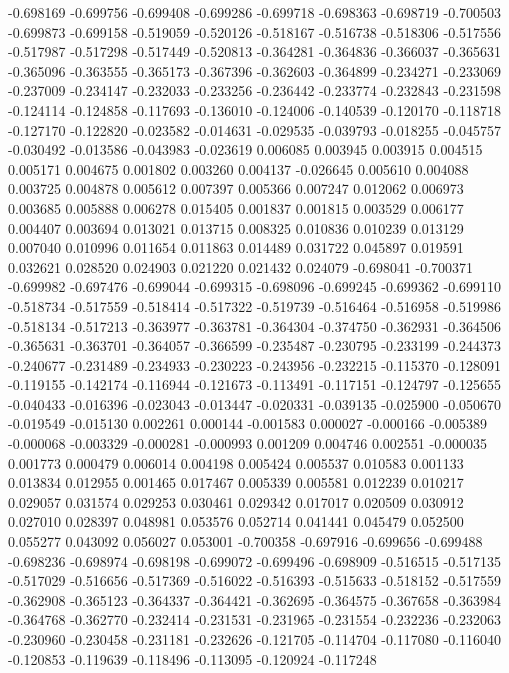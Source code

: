 -0.698169
-0.699756
-0.699408
-0.699286
-0.699718
-0.698363
-0.698719
-0.700503
-0.699873
-0.699158
-0.519059
-0.520126
-0.518167
-0.516738
-0.518306
-0.517556
-0.517987
-0.517298
-0.517449
-0.520813
-0.364281
-0.364836
-0.366037
-0.365631
-0.365096
-0.363555
-0.365173
-0.367396
-0.362603
-0.364899
-0.234271
-0.233069
-0.237009
-0.234147
-0.232033
-0.233256
-0.236442
-0.233774
-0.232843
-0.231598
-0.124114
-0.124858
-0.117693
-0.136010
-0.124006
-0.140539
-0.120170
-0.118718
-0.127170
-0.122820
-0.023582
-0.014631
-0.029535
-0.039793
-0.018255
-0.045757
-0.030492
-0.013586
-0.043983
-0.023619
0.006085
0.003945
0.003915
0.004515
0.005171
0.004675
0.001802
0.003260
0.004137
-0.026645
0.005610
0.004088
0.003725
0.004878
0.005612
0.007397
0.005366
0.007247
0.012062
0.006973
0.003685
0.005888
0.006278
0.015405
0.001837
0.001815
0.003529
0.006177
0.004407
0.003694
0.013021
0.013715
0.008325
0.010836
0.010239
0.013129
0.007040
0.010996
0.011654
0.011863
0.014489
0.031722
0.045897
0.019591
0.032621
0.028520
0.024903
0.021220
0.021432
0.024079
-0.698041
-0.700371
-0.699982
-0.697476
-0.699044
-0.699315
-0.698096
-0.699245
-0.699362
-0.699110
-0.518734
-0.517559
-0.518414
-0.517322
-0.519739
-0.516464
-0.516958
-0.519986
-0.518134
-0.517213
-0.363977
-0.363781
-0.364304
-0.374750
-0.362931
-0.364506
-0.365631
-0.363701
-0.364057
-0.366599
-0.235487
-0.230795
-0.233199
-0.244373
-0.240677
-0.231489
-0.234933
-0.230223
-0.243956
-0.232215
-0.115370
-0.128091
-0.119155
-0.142174
-0.116944
-0.121673
-0.113491
-0.117151
-0.124797
-0.125655
-0.040433
-0.016396
-0.023043
-0.013447
-0.020331
-0.039135
-0.025900
-0.050670
-0.019549
-0.015130
0.002261
0.000144
-0.001583
0.000027
-0.000166
-0.005389
-0.000068
-0.003329
-0.000281
-0.000993
0.001209
0.004746
0.002551
-0.000035
0.001773
0.000479
0.006014
0.004198
0.005424
0.005537
0.010583
0.001133
0.013834
0.012955
0.001465
0.017467
0.005339
0.005581
0.012239
0.010217
0.029057
0.031574
0.029253
0.030461
0.029342
0.017017
0.020509
0.030912
0.027010
0.028397
0.048981
0.053576
0.052714
0.041441
0.045479
0.052500
0.055277
0.043092
0.056027
0.053001
-0.700358
-0.697916
-0.699656
-0.699488
-0.698236
-0.698974
-0.698198
-0.699072
-0.699496
-0.698909
-0.516515
-0.517135
-0.517029
-0.516656
-0.517369
-0.516022
-0.516393
-0.515633
-0.518152
-0.517559
-0.362908
-0.365123
-0.364337
-0.364421
-0.362695
-0.364575
-0.367658
-0.363984
-0.364768
-0.362770
-0.232414
-0.231531
-0.231965
-0.231554
-0.232236
-0.232063
-0.230960
-0.230458
-0.231181
-0.232626
-0.121705
-0.114704
-0.117080
-0.116040
-0.120853
-0.119639
-0.118496
-0.113095
-0.120924
-0.117248
